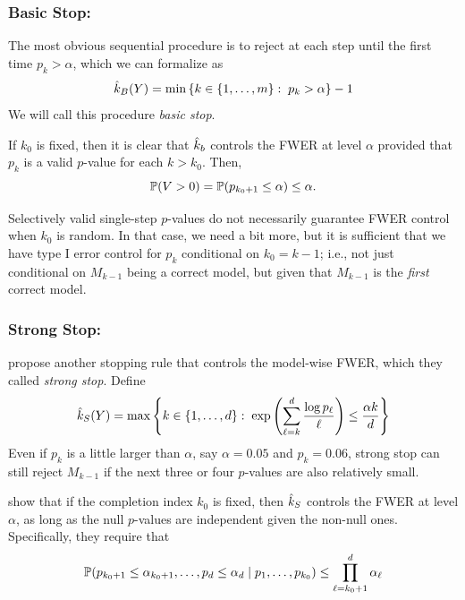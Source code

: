 \documentclass{article}
\begin{document}
\subsubsection{Basic Stop:}


The most obvious sequential procedure is to reject at each step until the first time $p_k > \alpha$, which we can formalize as
\[
\hk_B(Y) = \min\left\{k \in \{1,\ldots,m\} :\;
  p_k > \alpha\right\} - 1
\]
We will call this procedure {\em basic stop}. 

If $k_0$ is fixed, then it is clear that $\hk_b$ controls the FWER at level $\alpha$ provided that $p_{k}$ is a valid $p$-value for each $k>k_0$. Then, 
\[
\P(V>0) = \P(p_{k_0+1} \leq \alpha) \leq \alpha.
\]

Selectively valid single-step $p$-values do not necessarily guarantee FWER control when $k_0$ is random. In that case, we need a bit more, but it is sufficient that we have type I error control for $p_k$ conditional on $k_0=k-1$; i.e., not just conditional on $M_{k-1}$ being a correct model, but given that $M_{k-1}$ is the {\em first} correct model.

\subsubsection{Strong Stop:}

\citet{gsell2013sequential} propose another stopping rule that controls the model-wise FWER, which they called {\em strong stop}. Define
\[
  \hk_{S}(Y) = \max\left\{k \in \{1,\ldots,d\} :\;
    \exp\left(\sum_{\ell=k}^d \frac{\log p_\ell}{\ell}\right) 
    \leq \frac{\alpha k}{d}\right\}
\]
Even if $p_k$ is a little larger than $\alpha$, say $\alpha=0.05$ and $p_k=0.06$, strong stop can still reject $M_{k-1}$ if the next three or four $p$-values are also relatively small.

\citet{gsell2013sequential} show that if the completion index $k_0$ is fixed, then $\hk_S$ controls the FWER at level $\alpha$, as long as the null $p$-values are independent given the non-null ones. Specifically, they require that
\begin{equation}\label{eq:indepCond_fixed_k0}
\P(p_{k_0+1} \leq \alpha_{k_0+1}, \ldots, p_d \leq \alpha_d
\mid p_1, \ldots, p_{k_0}) \leq \prod_{\ell=k_0+1}^d \alpha_\ell
\end{equation}
\end{document}
